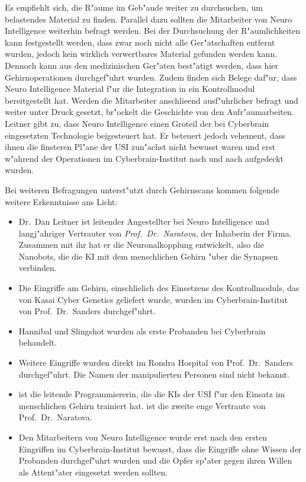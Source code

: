 Es empfiehlt sich, die R"aume im Geb"aude weiter zu durchsuchen, um belastendes Material zu finden. Parallel dazu sollten die Mitarbeiter von Neuro Intelligence weiterhin befragt werden. Bei der Durchsuchung der R"aumlichkeiten kann festgestellt werden, dass zwar noch nicht alle Ger"atschaften entfernt wurden, jedoch kein wirklich verwertbares Material gefunden werden kann. Dennoch kann aus den medizinischen Ger"aten best"atigt werden, dass hier Gehirnoperationen durchgef"uhrt wurden. Zudem finden sich Belege daf"ur, dass Neuro Intelligence Material f"ur die Integration in ein Kontrollmodul bereitgestellt hat. Werden die Mitarbeiter anschlie\3end ausf"uhrlicher befragt und weiter unter Druck gesetzt, br"ockelt die Geschichte von den Aufr"aumarbeiten. Leitner gibt zu, dass Neuro Intelligence einen Gro\3teil der bei Cyberbrain eingesetzten Technologie beigesteuert hat. Er beteuert jedoch vehement, dass ihnen die finsteren Pl"ane der USI zun"achst nicht bewusst waren und erst w"ahrend der Operationen im Cyberbrain-Institut nach und nach aufgedeckt wurden.

Bei weiteren Befragungen unterst"utzt durch Gehirnscans kommen folgende weitere Erkenntnisse ans Licht:

\begin{itemize}
	\item Dr.~Dan Leitner ist leitender Angestellter bei Neuro Intelligence und langj"ahriger Vertrauter von \emph{Prof.~Dr.~Naratova}, der 
		Inhaberin der Firma. Zusammen mit ihr hat er die Neuronalkopplung entwickelt, also die Nanobots, die die KI mit dem menschlichen Gehirn "uber die Synapsen verbinden.
	\item Die Eingriffe am Gehirn, einschlie\3lich des Einsetzens des Kontrollmoduls, das von Kasai Cyber Genetics geliefert wurde, wurden 
		im Cyberbrain-Institut von Prof.~Dr.~Sanders durchgef"uhrt.
	\item Hannibal und Slingshot wurden als erste Probanden bei Cyberbrain behandelt.
	\item Weitere Eingriffe wurden direkt im Rondra Hospital von Prof.~Dr.~Sanders durchgef"uhrt. Die Namen der manipulierten Personen sind 
		nicht bekannt.
	\item \ml{} ist die leitende Programmiererin, die die KIs der USI f"ur den Einsatz im menschlichen Gehirn trainiert hat. \ml{} ist die zweite 
		enge Vertraute  von Prof.~Dr.~Naratova.
	\item Den Mitarbeitern von Neuro Intelligence wurde erst nach den ersten Eingriffen im Cyberbrain-Institut bewusst, dass die Eingriffe 
		ohne Wissen der Probanden durchgef"uhrt wurden und die Opfer sp"ater gegen ihren Willen als Attent"ater eingesetzt werden sollten.
\end{itemize}

